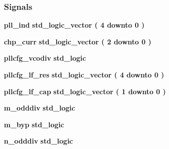 \subsubsection*{Signals}
 \begin{DoxyCompactItemize}
\item 
{\bf pll\+\_\+ind} {\bfseries \textcolor{comment}{std\+\_\+logic\+\_\+vector}\textcolor{vhdlchar}{ }\textcolor{vhdlchar}{(}\textcolor{vhdlchar}{ }\textcolor{vhdlchar}{ } \textcolor{vhdldigit}{4} \textcolor{vhdlchar}{ }\textcolor{keywordflow}{downto}\textcolor{vhdlchar}{ }\textcolor{vhdlchar}{ } \textcolor{vhdldigit}{0} \textcolor{vhdlchar}{ }\textcolor{vhdlchar}{)}\textcolor{vhdlchar}{ }} 
\item 
{\bf chp\+\_\+curr} {\bfseries \textcolor{comment}{std\+\_\+logic\+\_\+vector}\textcolor{vhdlchar}{ }\textcolor{vhdlchar}{(}\textcolor{vhdlchar}{ }\textcolor{vhdlchar}{ } \textcolor{vhdldigit}{2} \textcolor{vhdlchar}{ }\textcolor{keywordflow}{downto}\textcolor{vhdlchar}{ }\textcolor{vhdlchar}{ } \textcolor{vhdldigit}{0} \textcolor{vhdlchar}{ }\textcolor{vhdlchar}{)}\textcolor{vhdlchar}{ }} 
\item 
{\bf pllcfg\+\_\+vcodiv} {\bfseries \textcolor{comment}{std\+\_\+logic}\textcolor{vhdlchar}{ }} 
\item 
{\bf pllcfg\+\_\+lf\+\_\+res} {\bfseries \textcolor{comment}{std\+\_\+logic\+\_\+vector}\textcolor{vhdlchar}{ }\textcolor{vhdlchar}{(}\textcolor{vhdlchar}{ }\textcolor{vhdlchar}{ } \textcolor{vhdldigit}{4} \textcolor{vhdlchar}{ }\textcolor{keywordflow}{downto}\textcolor{vhdlchar}{ }\textcolor{vhdlchar}{ } \textcolor{vhdldigit}{0} \textcolor{vhdlchar}{ }\textcolor{vhdlchar}{)}\textcolor{vhdlchar}{ }} 
\item 
{\bf pllcfg\+\_\+lf\+\_\+cap} {\bfseries \textcolor{comment}{std\+\_\+logic\+\_\+vector}\textcolor{vhdlchar}{ }\textcolor{vhdlchar}{(}\textcolor{vhdlchar}{ }\textcolor{vhdlchar}{ } \textcolor{vhdldigit}{1} \textcolor{vhdlchar}{ }\textcolor{keywordflow}{downto}\textcolor{vhdlchar}{ }\textcolor{vhdlchar}{ } \textcolor{vhdldigit}{0} \textcolor{vhdlchar}{ }\textcolor{vhdlchar}{)}\textcolor{vhdlchar}{ }} 
\item 
{\bf m\+\_\+odddiv} {\bfseries \textcolor{comment}{std\+\_\+logic}\textcolor{vhdlchar}{ }} 
\item 
{\bf m\+\_\+byp} {\bfseries \textcolor{comment}{std\+\_\+logic}\textcolor{vhdlchar}{ }} 
\item 
{\bf n\+\_\+odddiv} {\bfseries \textcolor{comment}{std\+\_\+logic}\textcolor{vhdlchar}{ }} 
\item 

\end{DoxyCompactItemize}
